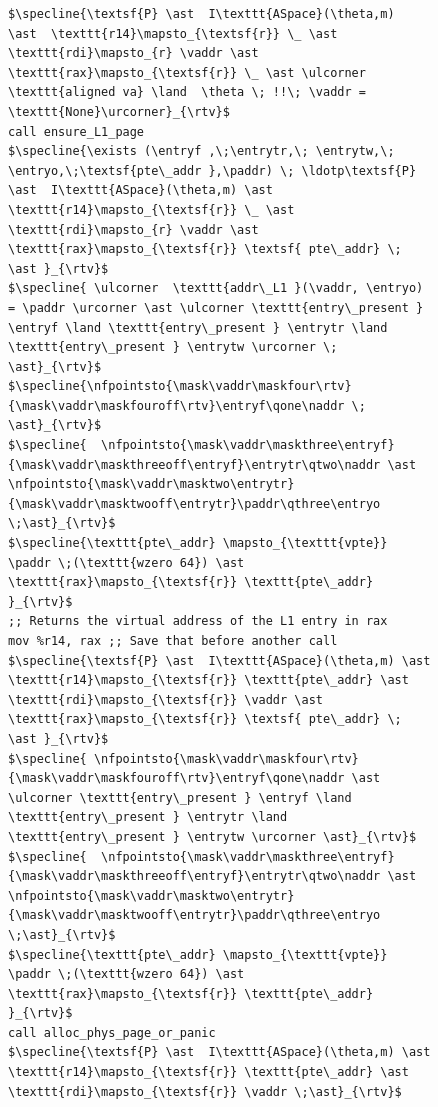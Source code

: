 \documentclass[acmsmall,screen,nonacm]{acmart}
\newcommand{\naddr}{\kw{a}}
\newcommand{\vaddr}{\kw{va}}
\newcommand{\nfpointsto}[5]{#1\sim#2 \mapsto_{#5}\{#4\}\;#3}
\newcommand{\maskfour}{\textsf{l4M52}}
\newcommand{\maskfouroff}{\textsf{l4off}}
\newcommand{\maskthree}{\textsf{l3M52}}
\newcommand{\maskthreeoff}{\textsf{l3off}}
\newcommand{\masktwo}{\textsf{l2M52}}
\newcommand{\masktwooff}{\textsf{l2off}}
\newcommand{\mask}[3]{(#2\; #1 \; #3)}
\newcommand{\entryf}{\textsf{l4e}}
\newcommand{\entrytr}{\textsf{l3e}}
\newcommand{\entrytw}{\textsf{l2e}}
\newcommand{\entryo}{\textsf{l1e}}
\newcommand{\paddr}{\textsf{pa}}
\newcommand{\kw}[1]{\mathsf{#1}}
\begin{document}
\begin{figure}\footnotesize
  \begin{lstlisting}
$\specline{\textsf{P} \ast  I\texttt{ASpace}(\theta,m)  \ast  \texttt{r14}\mapsto_{\textsf{r}} \_ \ast \texttt{rdi}\mapsto_{r} \vaddr \ast \texttt{rax}\mapsto_{\textsf{r}} \_ \ast \ulcorner \texttt{aligned va} \land  \theta \; !!\; \vaddr = \texttt{None}\urcorner}_{\rtv}$
call ensure_L1_page
$\specline{\exists (\entryf ,\;\entrytr,\; \entrytw,\; \entryo,\;\textsf{pte\_addr },\paddr) \; \ldotp\textsf{P} \ast  I\texttt{ASpace}(\theta,m) \ast  \texttt{r14}\mapsto_{\textsf{r}} \_ \ast \texttt{rdi}\mapsto_{r} \vaddr \ast \texttt{rax}\mapsto_{\textsf{r}} \textsf{ pte\_addr} \; \ast }_{\rtv}$
$\specline{ \ulcorner  \texttt{addr\_L1 }(\vaddr, \entryo) = \paddr \urcorner \ast \ulcorner \texttt{entry\_present } \entryf \land \texttt{entry\_present } \entrytr \land  \texttt{entry\_present } \entrytw \urcorner \; \ast}_{\rtv}$
$\specline{\nfpointsto{\mask\vaddr\maskfour\rtv}{\mask\vaddr\maskfouroff\rtv}\entryf\qone\naddr \; \ast}_{\rtv}$ 
$\specline{  \nfpointsto{\mask\vaddr\maskthree\entryf}{\mask\vaddr\maskthreeoff\entryf}\entrytr\qtwo\naddr \ast \nfpointsto{\mask\vaddr\masktwo\entrytr}{\mask\vaddr\masktwooff\entrytr}\paddr\qthree\entryo \;\ast}_{\rtv}$
$\specline{\texttt{pte\_addr} \mapsto_{\texttt{vpte}} \paddr \;(\texttt{wzero 64}) \ast \texttt{rax}\mapsto_{\textsf{r}} \texttt{pte\_addr}  }_{\rtv}$
;; Returns the virtual address of the L1 entry in rax
mov %r14, rax ;; Save that before another call
$\specline{\textsf{P} \ast  I\texttt{ASpace}(\theta,m) \ast  \texttt{r14}\mapsto_{\textsf{r}} \texttt{pte\_addr} \ast \texttt{rdi}\mapsto_{\textsf{r}} \vaddr \ast \texttt{rax}\mapsto_{\textsf{r}} \textsf{ pte\_addr} \; \ast }_{\rtv}$
$\specline{ \nfpointsto{\mask\vaddr\maskfour\rtv}{\mask\vaddr\maskfouroff\rtv}\entryf\qone\naddr \ast \ulcorner \texttt{entry\_present } \entryf \land \texttt{entry\_present } \entrytr \land  \texttt{entry\_present } \entrytw \urcorner \ast}_{\rtv}$ 
$\specline{  \nfpointsto{\mask\vaddr\maskthree\entryf}{\mask\vaddr\maskthreeoff\entryf}\entrytr\qtwo\naddr \ast \nfpointsto{\mask\vaddr\masktwo\entrytr}{\mask\vaddr\masktwooff\entrytr}\paddr\qthree\entryo \;\ast}_{\rtv}$
$\specline{\texttt{pte\_addr} \mapsto_{\texttt{vpte}} \paddr \;(\texttt{wzero 64}) \ast \texttt{rax}\mapsto_{\textsf{r}} \texttt{pte\_addr}  }_{\rtv}$
call alloc_phys_page_or_panic
$\specline{\textsf{P} \ast  I\texttt{ASpace}(\theta,m) \ast  \texttt{r14}\mapsto_{\textsf{r}} \texttt{pte\_addr} \ast \texttt{rdi}\mapsto_{\textsf{r}} \vaddr \;\ast}_{\rtv}$

\end{lstlisting}
\end{figure}
\end{document}
